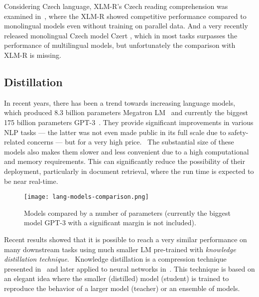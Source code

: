     Considering Czech language, XLM-R's Czech reading comprehension was examined in~\parencite{Mackov_2020_czech_xlmr}, where the XLM-R showed competitive performance compared to monolingual models even without training on parallel data. And a very recently released monolingual Czech model Czert \parencite{sido2021czert}, which in most tasks surpasses the performance of multilingual models, but unfortunately the comparison with XLM-R is missing.

\subsection{Distillation}
\label{section:distillation}
    In recent years, there has been a trend towards increasing language models, which produced 8.3 billion parameters Megatron LM~\parencite{shoeybi2019megatronlm} and currently the biggest 175 billion parameters GPT-3~\parencite{brown2020language-gpt3}. They provide significant improvements in various NLP tasks --- the latter was not even made public in its full scale due to safety-related concerns --- but for a very high price.~\parencite{Schwartz_2020} 
    The substantial size of these models also makes them slower and less convenient due to a high computational and memory requirements. This can significantly reduce the possibility of their deployment, particularly in document retrieval, where the run time is expected to be near real-time.
    
    \begin{figure}[H]
        \texttt{[image: lang-models-comparison.png]}
        \centering
        \caption[Language models comparison by number of parameters]{Models compared by a number of parameters (currently the biggest model GPT-3 with a significant margin is not included).~\parencite{language-models-comparison}}
        \label{fig:model-parameters-comparison}
    \end{figure}
    
    Recent results showed that it is possible to reach a very similar performance on many downstream tasks using much smaller LM pre-trained with \emph{knowledge distillation technique}.~\parencite{Sanh2019DistilBERTAD} Knowledge distillation is a compression technique presented in~\parencite{distillation} and later applied to neural networks in~\parencite{hinton2015distilling}. This technique is based on an elegant idea where the smaller (distilled) model (student) is trained to reproduce the behavior of a larger model (teacher) or an ensemble of models. 
    
